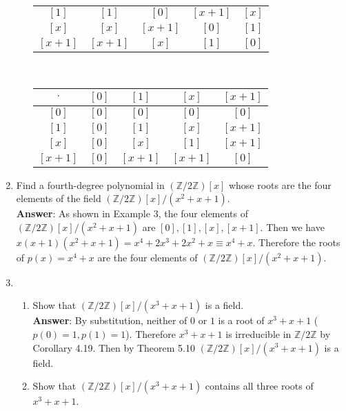 \documentclass{article}
\begin{document}
\begin{enumerate}
\begin{enumerate}
\begin{center}
\begin{tabular}{c|c c c c}
                                    $[1]$   & $[1]$   & $[0]$   & $[x+1]$ & $[x]$   \\
                                    $[x]$   & $[x]$   & $[x+1]$ & $[0]$   & $[1]$   \\
                                    $[x+1]$ & $[x+1]$ & $[x]$   & $[1]$   & $[0]$
                              \end{tabular}\\
                              \begin{tabular}{c|c c c c}
                                    $\cdot$ & $[0]$ & $[1]$   & $[x]$   & $[x+1]$ \\
                                    \hline
                                    $[0]$   & $[0]$ & $[0]$   & $[0]$   & $[0]$   \\
                                    $[1]$   & $[0]$ & $[1]$   & $[x]$   & $[x+1]$ \\
                                    $[x]$   & $[0]$ & $[x]$   & $[1]$   & $[x+1]$ \\
                                    $[x+1]$ & $[0]$ & $[x+1]$ & $[x+1]$ & $[0]$
                              \end{tabular}
                        \end{center}
            \end{enumerate}
      \item Find a fourth-degree polynomial in $(\mathbb{Z}/2\mathbb{Z})[x]$ whose roots are the four elements of the field $(\mathbb{Z}/2\mathbb{Z})[x]/(x^2+x+1)$.\\
            \textbf{Answer}: As shown in Example 3, the four elements of $(\mathbb{Z}/2\mathbb{Z})[x]/(x^2+x+1)$ are $[0],[1],[x],[x+1]$. Then we have $x(x+1)(x^2+x+1)=x^4+2x^3+2x^2+x\equiv x^4+x$. Therefore the roots of $p(x)=x^4+x$ are the four elements of $(\mathbb{Z}/2\mathbb{Z})[x]/(x^2+x+1)$.
      \item
            \begin{enumerate}
                  \item Show that $(\mathbb{Z}/2\mathbb{Z})[x]/(x^3+x+1)$ is a field.\\
                        \textbf{Answer}: By substitution, neither of $0$ or $1$ is a root of $x^3+x+1$ ($p(0)=1,p(1)=1$). Therefore $x^3+x+1$ is irreducible in $\mathbb{Z}/2\mathbb{Z}$ by Corollary 4.19. Then by Theorem 5.10 $(\mathbb{Z}/2\mathbb{Z})[x]/(x^3+x+1)$ is a field.
                  \item Show that $(\mathbb{Z}/2\mathbb{Z})[x]/(x^3+x+1)$ contains all three roots of $x^3+x+1$.\\

\end{enumerate}
\end{enumerate}
\end{document}
